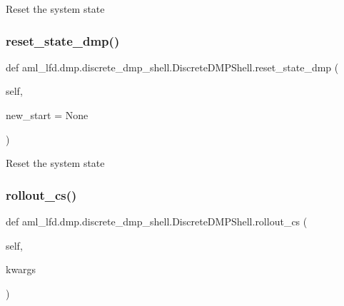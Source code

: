 \begin{DoxyVerb}Reset the system state\end{DoxyVerb}
 \hypertarget{classaml__lfd_1_1dmp_1_1discrete__dmp__shell_1_1_discrete_d_m_p_shell_a07482e8fe6955be1c72e67258953e298}{}\label{classaml__lfd_1_1dmp_1_1discrete__dmp__shell_1_1_discrete_d_m_p_shell_a07482e8fe6955be1c72e67258953e298} 
\subsubsection{\texorpdfstring{reset\+\_\+state\+\_\+dmp()}{reset\_state\_dmp()}}
{\footnotesize\ttfamily def aml\+\_\+lfd.\+dmp.\+discrete\+\_\+dmp\+\_\+shell.\+Discrete\+D\+M\+P\+Shell.\+reset\+\_\+state\+\_\+dmp (\begin{DoxyParamCaption}\item[{}]{self,  }\item[{}]{new\+\_\+start = {\ttfamily None} }\end{DoxyParamCaption})}

\begin{DoxyVerb}Reset the system state\end{DoxyVerb}
 \hypertarget{classaml__lfd_1_1dmp_1_1discrete__dmp__shell_1_1_discrete_d_m_p_shell_a21a2c8cac5774e8dbd87a211fda6ef05}{}\label{classaml__lfd_1_1dmp_1_1discrete__dmp__shell_1_1_discrete_d_m_p_shell_a21a2c8cac5774e8dbd87a211fda6ef05} 
\subsubsection{\texorpdfstring{rollout\+\_\+cs()}{rollout\_cs()}}
{\footnotesize\ttfamily def aml\+\_\+lfd.\+dmp.\+discrete\+\_\+dmp\+\_\+shell.\+Discrete\+D\+M\+P\+Shell.\+rollout\+\_\+cs (\begin{DoxyParamCaption}\item[{}]{self,  }\item[{}]{kwargs }\end{DoxyParamCaption})}

